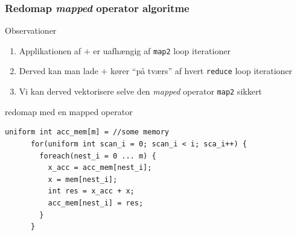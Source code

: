 \documentclass[t]{beamer}
\begin{document}
\begin{frame}[fragile]
  \frametitle{Redomap \textit{mapped} operator algoritme}
  Observationer
  \begin{enumerate}
    \item Applikationen af $+$ er uafhængig af \texttt{map2} loop iterationer
    \item Derved kan man lade $+$ kører ``på tværs'' af hvert \texttt{reduce} loop iterationer
    \item Vi kan derved vektorisere selve den \textit{mapped} operator \texttt{map2} sikkert
  \end{enumerate}
  \begin{block}{redomap med en mapped operator}
    \begin{lstlisting}[language=ispc]
      uniform int acc_mem[m] = //some memory
      for(uniform int scan_i = 0; scan_i < i; sca_i++) {
        foreach(nest_i = 0 ... m) {
          x_acc = acc_mem[nest_i];
          x = mem[nest_i];
          int res = x_acc + x;
          acc_mem[nest_i] = res;
        }
      }
    \end{lstlisting}
  \end{block}
\end{frame}
\end{document}
